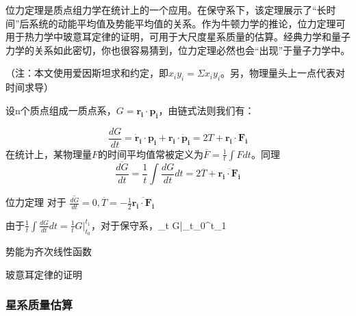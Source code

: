 位力定理是质点组力学在统计上的一个应用。在保守系下，该定理展示了“长时间”后系统的动能平均值及势能平均值的关系。作为牛顿力学的推论，位力定理可用于热力学中玻意耳定律的证明，可用于大尺度星系质量的估算。经典力学和量子力学的关系如此密切，你也很容易猜到，位力定理必然也会“出现”于量子力学中。

（注：本文使用爱因斯坦求和约定，即$x_iy_i=\Sigma x_iy_i$。另，物理量头上一点代表对时间求导）

设n个质点组成一质点系，$G=\boldsymbol{r_i\cdot p_i}$，由链式法则我们有：

\begin{equation}
\frac{dG}{dt}=\boldsymbol{\dot{r}_i\cdot p_i}+\boldsymbol{r_i\cdot\dot{p}_i}=2T+\boldsymbol{r_i\cdot F_i}
\end{equation}
在统计上，某物理量$F$的时间平均值常被定义为$\overline{F}=\frac{1}{t}\int Fdt $。同理
\begin{equation}
\overline{\frac{dG}{dt}}=\frac{1}{t}\int \frac{dG}{dt}dt=2\overline{ T}+\overline{\boldsymbol{r_i\cdot F_i}}
\end{equation}

\begin{theorem}{位力定理}
对于 $\overline{\frac{dG}{dt}}=0,
\overline{ T}=-\frac{1}{2}\overline{\boldsymbol{r_i\cdot F_i}}$
\end{theorem}
由于$\frac{1}{t}\int \frac{dG}{dt}dt=\frac{1}{t}G\big|_{t_0}^{t_1}$，对于保守系，\lim_{t \to \infty}G\big|_{t_0}^{t_1}
\begin{corollary}{势能为齐次线性函数}

\end{corollary}
\begin{exercise}{玻意耳定律的证明}

\end{exercise}
\subsubsection{星系质量估算}  